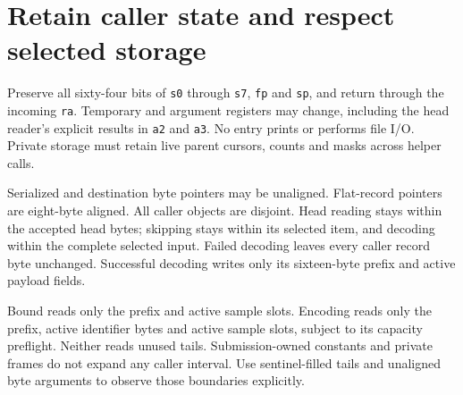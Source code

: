 \section{Retain caller state and respect selected storage}
Preserve all sixty-four bits of \texttt{s0} through \texttt{s7}, \texttt{fp} and
\texttt{sp}, and return through the incoming \texttt{ra}. Temporary and argument
registers may change, including the head reader's explicit results in \texttt{a2} and
\texttt{a3}. No entry prints or performs file I/O. Private storage must retain live
parent cursors, counts and masks across helper calls.

Serialized and destination byte pointers may be unaligned. Flat-record pointers are
eight-byte aligned. All caller objects are disjoint. Head reading stays within the
accepted head bytes; skipping stays within its selected item, and decoding within the
complete selected input. Failed decoding leaves every caller record byte unchanged.
Successful decoding writes only its sixteen-byte prefix and active payload fields.

Bound reads only the prefix and active sample slots. Encoding reads only the prefix,
active identifier bytes and active sample slots, subject to its capacity preflight.
Neither reads unused tails. Submission-owned constants and private frames do not
expand any caller interval. Use sentinel-filled tails and unaligned byte arguments to
observe those boundaries explicitly.
